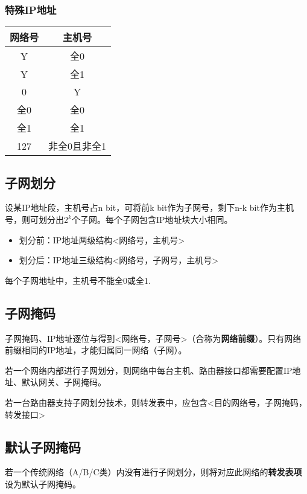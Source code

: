 \subsubsection{特殊IP地址}
\begin{center}
    \begin{tabular}{c|c}
        \hline
        网络号 & 主机号 \\
        \hline
        Y & 全0 \\ 
        \hline
        Y & 全1 \\ 
        \hline
        0 & Y \\ 
        \hline
        全0 & 全0 \\
        \hline
        全1 & 全1 \\ 
        \hline
        127 & 非全0且非全1 \\ 
        \hline
    \end{tabular}
\end{center}


\subsection{子网划分}
设某IP地址段，主机号占n bit，可将前k bit作为子网号，剩下n-k bit作为主机号，则可划分出\(2^k\)个子网。每个子网包含IP地址块大小相同。

\begin{itemize}
    \item 划分前：IP地址两级结构<网络号，主机号>
    \item 划分后：IP地址三级结构<网络号，子网号，主机号>
\end{itemize}

每个子网地址中，主机号不能全0或全1.


\subsection{子网掩码}
子网掩码、IP地址逐位与得到<网络号，子网号>（合称为\textbf{网络前缀}）。只有网络前缀相同的IP地址，才能归属同一网络（子网）。

若一个网络内部进行子网划分，则网络中每台主机、路由器接口都需要配置IP地址、默认网关、子网掩码。

若一台路由器支持子网划分技术，则转发表中，应包含<目的网络号，子网掩码，转发接口>


\subsection{默认子网掩码}
若一个传统网络（A/B/C类）内没有进行子网划分，则将对应此网络的\textbf{转发表项}设为默认子网掩码。


